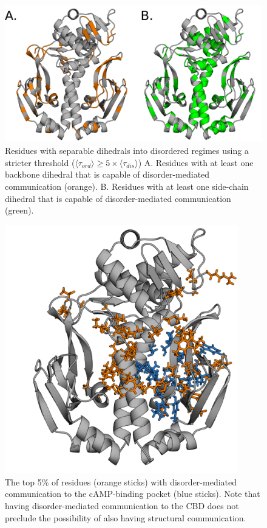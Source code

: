 \documentclass[../main.tex]{subfiles}
\begin{document}
    \begin{figure}[!htb] %
        \centering
        \includegraphics[width=4.5in]{suppfig4-disord-resis-cutoff.png}
        \caption[Residues with separable dihedrals into disordered regimes]{Residues with separable dihedrals into disordered regimes using a stricter threshold ($\langle\tau_{ord}\rangle \geq 5\times\langle\tau_{dis}\rangle$) A. Residues with at least one backbone dihedral that is capable of disorder-mediated communication (orange). B. Residues with at least one side-chain dihedral that is capable of disorder-mediated communication (green).}
        \label{fig:cards-disord-resis-cutoff}
    \end{figure} 

    \begin{figure}[!htb] %
        \centering
        \includegraphics[width=4in]{suppfig5-top5percentresis.png}
        \caption[The top 5\% of residues (orange sticks) with disorder-mediated communication to the cAMP-binding pocket]{The top 5\% of residues (orange sticks) with disorder-mediated communication to the cAMP-binding pocket (blue sticks). Note that having disorder-mediated communication to the CBD does not preclude the possibility of also having structural communication.}
        \label{fig:cards-top5percentresis}
    \end{figure} 
\end{document}
